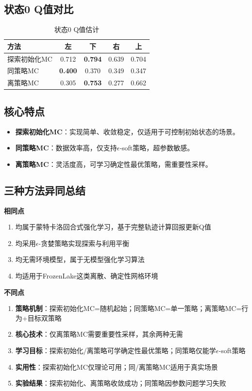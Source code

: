 \documentclass[11pt,a4paper]{article}
\begin{document}
\subsection{状态0 Q值对比}
\begin{table}[H]
\centering
\small
\caption{状态0 Q值估计}
\begin{tabular}{lcccc}
\toprule
方法 & 左 & 下 & 右 & 上 \\
\midrule
探索初始化MC & 0.712 & \textbf{0.794} & 0.639 & 0.704 \\
同策略MC & \textbf{0.400} & 0.370 & 0.349 & 0.347 \\
离策略MC & 0.305 & \textbf{0.753} & 0.277 & 0.662 \\
\bottomrule
\end{tabular}
\end{table}

\subsection{核心特点}
\begin{itemize}
    \item \textbf{探索初始化MC}：实现简单、收敛稳定，仅适用于可控制初始状态的场景。
    \item \textbf{同策略MC}：数据效率高，仅支持$\epsilon$-soft策略，超参数敏感。
    \item \textbf{离策略MC}：灵活度高，可学习确定性最优策略，需重要性采样。
\end{itemize}

\subsection{三种方法异同总结}
\textbf{相同点}
\begin{enumerate}
    \item 均属于蒙特卡洛回合式强化学习，基于完整轨迹计算回报更新Q值
    \item 均采用$\epsilon$-贪婪策略实现探索与利用平衡
    \item 均无需环境模型，属于无模型强化学习算法
    \item 均适用于FrozenLake这类离散、确定性网格环境
\end{enumerate}

\textbf{不同点}
\begin{enumerate}
    \item \textbf{策略机制}：探索初始化MC=随机起始；同策略MC=单一策略；离策略MC=行为+目标双策略
    \item \textbf{核心技术}：仅离策略MC需要重要性采样，其余两种无需
    \item \textbf{学习目标}：探索初始化/离策略可学确定性最优策略；同策略仅能学$\epsilon$-soft策略
    \item \textbf{实用性}：探索初始化MC仅理论可用；同/离策略MC适用于真实场景
    \item \textbf{实验结果}：探索初始化、离策略收敛成功；同策略因参数问题学习失败
\end{enumerate}
\end{document}
